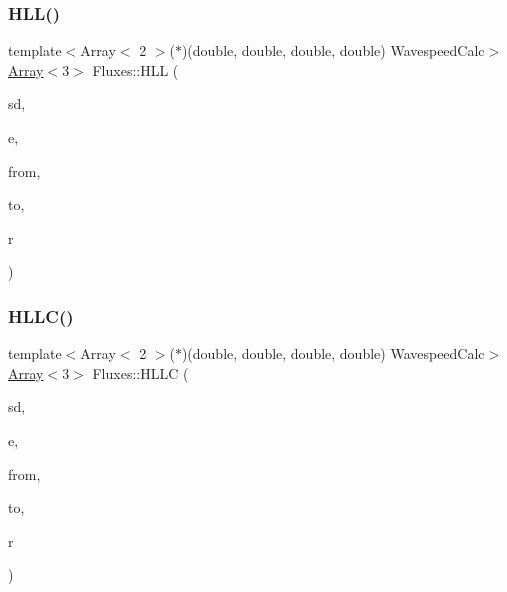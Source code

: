 \subsubsection{\texorpdfstring{H\+L\+L()}{HLL()}}
{\footnotesize\ttfamily template$<$Array$<$ 2 $>$($\ast$)(double, double, double, double) Wavespeed\+Calc$>$ \\
\hyperlink{Includes_8h_abd9de33944f934950000c3929e14ad8d}{Array}$<$3$>$ Fluxes\+::\+H\+LL (\begin{DoxyParamCaption}\item[{\hyperlink{structSpaceDisc}{Space\+Disc} $\ast$const}]{sd,  }\item[{\hyperlink{Includes_8h_ae78891cd308078a2f5f9e7193065c805}{Idx}}]{e,  }\item[{\hyperlink{Includes_8h_ae78891cd308078a2f5f9e7193065c805}{Idx}}]{from,  }\item[{\hyperlink{Includes_8h_ae78891cd308078a2f5f9e7193065c805}{Idx}}]{to,  }\item[{double $\ast$}]{r }\end{DoxyParamCaption})}

\mbox{\label{namespaceFluxes_a368a60482d4b0b6248889887ddb71a7a}} 
\subsubsection{\texorpdfstring{H\+L\+L\+C()}{HLLC()}}
{\footnotesize\ttfamily template$<$Array$<$ 2 $>$($\ast$)(double, double, double, double) Wavespeed\+Calc$>$ \\
\hyperlink{Includes_8h_abd9de33944f934950000c3929e14ad8d}{Array}$<$3$>$ Fluxes\+::\+H\+L\+LC (\begin{DoxyParamCaption}\item[{\hyperlink{structSpaceDisc}{Space\+Disc} $\ast$const}]{sd,  }\item[{\hyperlink{Includes_8h_ae78891cd308078a2f5f9e7193065c805}{Idx}}]{e,  }\item[{\hyperlink{Includes_8h_ae78891cd308078a2f5f9e7193065c805}{Idx}}]{from,  }\item[{\hyperlink{Includes_8h_ae78891cd308078a2f5f9e7193065c805}{Idx}}]{to,  }\item[{double $\ast$}]{r }\end{DoxyParamCaption})}

